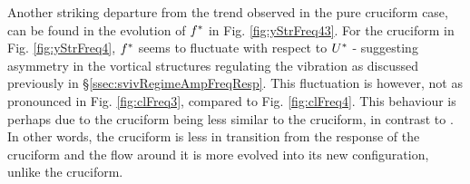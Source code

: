\documentclass[oneside]{utmthesis}
\begin{document}
Another striking departure from the trend observed in the pure cruciform case, can be found in the evolution of $f^{*}$ in Fig. \ref{fig:yStrFreq43}. For the \angfo{} cruciform in Fig. \ref{fig:yStrFreq4}, $f^{*}$ seems to fluctuate with respect to $U^{*}$ - suggesting asymmetry in the vortical structures regulating the vibration as discussed previously in \S\ref{ssec:svivRegimeAmpFreqResp}. This fluctuation is however, not as pronounced in Fig. \ref{fig:clFreq3}, compared to Fig. \ref{fig:clFreq4}. This behaviour is perhaps due to the \angth{} cruciform being less similar to the \angfi{} cruciform, in contrast to \angfo{}. In other words, the \angth{} cruciform is less in transition from the response of the \angfi{} cruciform and the flow around it is more evolved into its new configuration, unlike the \angfo{} cruciform.
\end{document}
